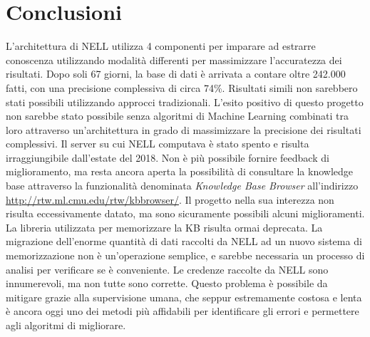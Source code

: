 \section*{Conclusioni}
L'architettura di NELL utilizza 4 componenti per imparare ad estrarre conoscenza utilizzando modalità differenti per massimizzare l'accuratezza dei risultati.
Dopo soli 67 giorni, la base di dati è arrivata a contare oltre 242.000 fatti, con una precisione complessiva di circa 74\%.\newline
Risultati simili non sarebbero stati possibili utilizzando approcci tradizionali. L'esito positivo di questo progetto non sarebbe stato possibile senza algoritmi di Machine Learning combinati tra loro attraverso un'architettura in grado di massimizzare la precisione dei risultati complessivi.\newline\newline
\noindent Il server su cui NELL computava è stato spento e risulta irraggiungibile dall'estate del 2018. Non è più possibile fornire feedback di miglioramento, ma resta ancora aperta la possibilità di consultare la knowledge base attraverso la funzionalità denominata \textit{Knowledge Base Browser} all'indirizzo \url{http://rtw.ml.cmu.edu/rtw/kbbrowser/}.\newline
\newline
Il progetto nella sua interezza non risulta eccessivamente datato, ma sono sicuramente possibili alcuni miglioramenti. La libreria utilizzata per memorizzare la KB risulta ormai deprecata. La migrazione dell'enorme quantità di dati raccolti da NELL ad un nuovo sistema di memorizzazione non è un'operazione semplice, e sarebbe necessaria un processo di analisi per verificare se è conveniente.\newline\newline
Le credenze raccolte da NELL sono innumerevoli, ma non tutte sono corrette. Questo problema è possibile da mitigare grazie alla supervisione umana, che seppur estremamente costosa e lenta è ancora oggi uno dei metodi più affidabili per identificare gli errori e permettere agli algoritmi di migliorare.
\newpage